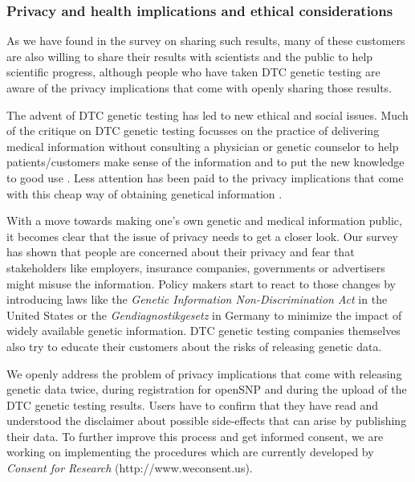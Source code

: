 \documentclass[10pt]{article}
\begin{document}
\subsubsection*{Privacy and health implications and ethical considerations}

As we have found in the survey on sharing such results, many of these customers are also willing to share their results with scientists and the public to help scientific progress, although people who have taken DTC genetic testing are aware of the privacy implications that come with openly sharing those results.      

The advent of DTC genetic testing has led to new ethical and social issues. Much of the critique on DTC genetic testing focusses on the practice of delivering medical information without consulting a physician or genetic counselor to help patients/customers make sense of the information and to put the new knowledge to good use \cite{Hauskeller2011,Hogarth2008,Wasson2009}. Less attention has been paid to the privacy implications that come with this cheap way of obtaining genetical information \cite{Caulfield2011,Joh2011}. 

With a move towards making one's own genetic and medical information public, it becomes clear that the issue of privacy needs to get a closer look. Our survey has shown that people are concerned about their privacy and fear that stakeholders like employers, insurance companies, governments or advertisers might misuse the information. Policy makers start to react to those changes by introducing laws like the \textit{Genetic Information Non-Discrimination Act} in the United States or the \emph{Gendiagnostikgesetz} in Germany to minimize the impact of widely available genetic information. DTC genetic testing companies themselves also try to educate their customers about the risks of releasing genetic data.  

We openly address the problem of privacy implications that come with releasing genetic data twice, during registration for openSNP and during the upload of the DTC genetic testing results. Users have to confirm that they have read and understood the disclaimer about possible side-effects that can arise by publishing their data. To further improve this process and get informed consent, we are working on implementing the procedures which are currently developed by \textit{Consent for Research} (http://www.weconsent.us).
 
\end{document}
